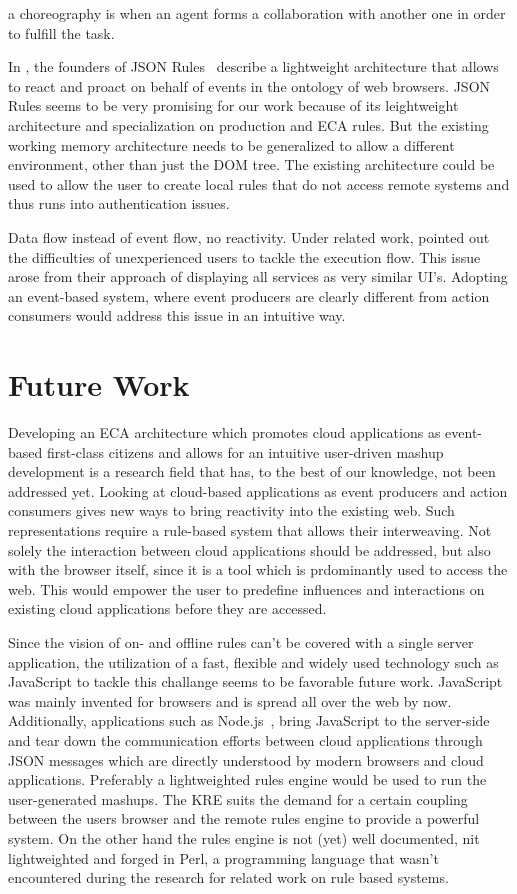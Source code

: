 \documentclass[11pt]{article}%
\begin{document}
a choreography is when an agent forms a collaboration with another one in order to fulfill the task.


In \cite{2009-Pascalau_Giurca-LWAECARE.pdf}, the founders of JSON Rules~\cite{2008-Giurca_Pascalau-JSON_Rules.pdf} describe a lightweight architecture that allows to react and proact on behalf of events in the ontology of web browsers.
JSON Rules seems to be very promising for our work because of its leightweight architecture and specialization on production and ECA rules. But the existing working memory architecture needs to be generalized to allow a different environment, other than just the DOM tree. The existing architecture could be used to allow the user to create local rules that do not access remote systems and thus runs into authentication issues.

Data flow instead of event flow, no reactivity.
Under related work, \cite{2010-Namoun_etal-EURCW.pdf} pointed out the difficulties of unexperienced users to tackle the execution flow. This issue arose from their approach of displaying all services as very similar UI's. Adopting an event-based system, where event producers are clearly different from action consumers would address this issue in an intuitive way.

\section{Future Work}

Developing an ECA architecture which promotes cloud applications as event-based first-class citizens and allows for an intuitive user-driven mashup development is a research field that has, to the best of our knowledge, not been addressed yet. Looking at cloud-based applications as event producers and action consumers gives new ways to bring reactivity into the existing web. Such representations require a rule-based system that allows their interweaving. Not solely the interaction between cloud applications should be addressed, but also with the browser itself, since it is a tool which is prdominantly used to access the web. This would empower the user to predefine influences and interactions on existing cloud applications before they are accessed.

Since the vision of on- and offline rules can't be covered with a single server application, the utilization of a fast, flexible and widely used technology such as JavaScript to tackle this challange seems to be favorable future work. JavaScript was mainly invented for browsers and is spread all over the web by now. Additionally, applications such as Node.js~\cite{wwwnodejs}, bring JavaScript to the server-side and tear down the communication efforts between cloud applications through JSON messages which are directly understood by modern browsers and cloud applications.
Preferably a lightweighted rules engine would be used to run the user-generated mashups. The KRE suits the demand for a certain coupling between the users browser and the remote rules engine to provide a powerful system. On the other hand the rules engine is not (yet) well documented, nit lightweighted and forged in Perl, a programming language that wasn't encountered during the research for related work on rule based systems.
\end{document}
